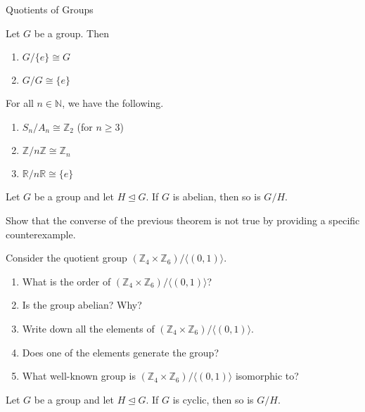 \begin{section}{Quotients of Groups}
\begin{theorem}
Let $G$ be a group.  Then
\begin{enumerate}[label=\rm{(\alph*)}]
\item $G/\{e\}\cong G$
\item $G/G\cong \{e\}$
\end{enumerate}
\end{theorem}

\begin{theorem}
For all $n\in \mathbb{N}$, we have the following.
\begin{enumerate}[label=\rm{(\alph*)}]
\item $S_n/A_n\cong \mathbb{Z}_2$ (for $n\geq 3$)
\item $\mathbb{Z}/n\mathbb{Z}\cong \mathbb{Z}_n$
\item $\mathbb{R}/n\mathbb{R}\cong \{e\}$
\end{enumerate}
\end{theorem}

\begin{theorem}
Let $G$ be a group and let $H\trianglelefteq G$.  If $G$ is abelian, then so is $G/H$.
\end{theorem}

\begin{problem}
Show that the converse of the previous theorem is not true by providing a specific counterexample.
\end{problem}

\begin{exercise}
Consider the quotient group $(\mathbb{Z}_4\times \mathbb{Z}_6)/\langle (0,1)\rangle$.
\begin{enumerate}[label=\rm{(\alph*)}]
\item What is the order of $(\mathbb{Z}_4\times \mathbb{Z}_6)/\langle (0,1)\rangle$?
\item Is the group abelian?  Why?
\item Write down all the elements of $(\mathbb{Z}_4\times \mathbb{Z}_6)/\langle (0,1)\rangle$.
\item Does one of the elements generate the group?
\item What well-known group is $(\mathbb{Z}_4\times \mathbb{Z}_6)/\langle (0,1)\rangle$ isomorphic to?
\end{enumerate}
\end{exercise}

\begin{theorem}
Let $G$ be a group and let $H\trianglelefteq G$.  If $G$ is cyclic, then so is $G/H$.
\end{theorem}


\end{section}
